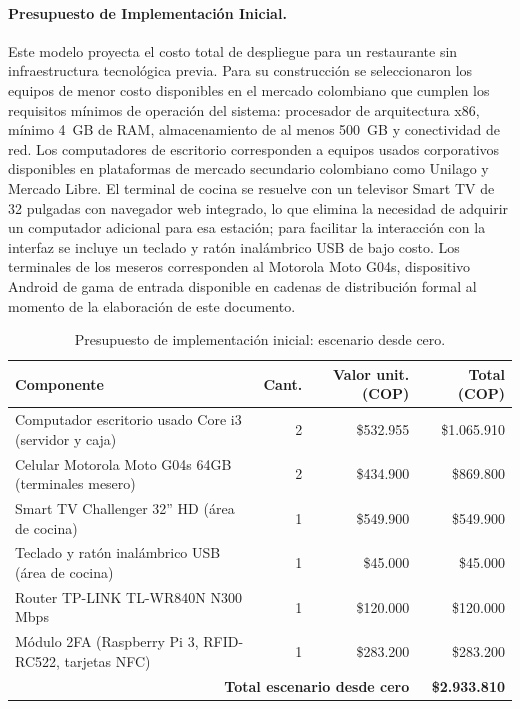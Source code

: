\paragraph{Presupuesto de Implementación Inicial.}
Este modelo proyecta el costo total de despliegue para un restaurante sin infraestructura
tecnológica previa. Para su construcción se seleccionaron los equipos de menor costo
disponibles en el mercado colombiano que cumplen los requisitos mínimos de operación del
sistema: procesador de arquitectura x86, mínimo 4~GB de RAM, almacenamiento de al menos
500~GB y conectividad de red. Los computadores de escritorio corresponden a equipos usados
corporativos disponibles en plataformas de mercado secundario colombiano como Unilago y
Mercado Libre. El terminal de cocina se resuelve con un televisor Smart TV de 32 pulgadas
con navegador web integrado, lo que elimina la necesidad de adquirir un computador
adicional para esa estación; para facilitar la interacción con la interfaz se incluye un
teclado y ratón inalámbrico USB de bajo costo. Los terminales de los meseros corresponden
al Motorola Moto G04s, dispositivo Android de gama de entrada disponible en cadenas de
distribución formal al momento de la elaboración de este documento.

\begin{table}[H]
	\centering
	\caption{Presupuesto de implementación inicial: escenario desde cero.}
	\label{tab:presupuesto_nuevo}
	\begin{tabular}{p{6.5cm} r r r}
		\hline
		\textbf{Componente} & \textbf{Cant.} & \textbf{Valor unit. (COP)} & \textbf{Total (COP)} \\
		\hline
		Computador escritorio usado Core i3 (servidor y caja)
		& 2 & \$532.955   & \$1.065.910 \\
		Celular Motorola Moto G04s 64GB (terminales mesero)
		& 2 & \$434.900   & \$869.800   \\
		Smart TV Challenger 32'' HD (área de cocina)
		& 1 & \$549.900   & \$549.900   \\
		Teclado y ratón inalámbrico USB (área de cocina)
		& 1 & \$45.000    & \$45.000    \\
		Router TP-LINK TL-WR840N N300 Mbps
		& 1 & \$120.000   & \$120.000   \\
		Módulo 2FA (Raspberry Pi 3, RFID-RC522, tarjetas NFC)
		& 1 & \$283.200   & \$283.200   \\
		\hline
		\multicolumn{3}{r}{\textbf{Total escenario desde cero}} & \textbf{\$2.933.810} \\
		\hline
	\end{tabular}
\end{table}

